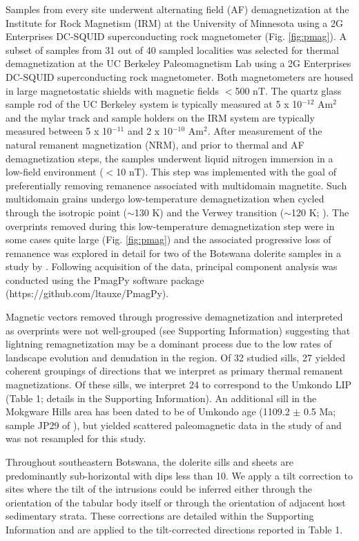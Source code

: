 \documentclass[11pt,letterpaper]{article}
\begin{document}
Samples from every site underwent alternating field (AF) demagnetization at the Institute for Rock Magnetism (IRM) at the University of Minnesota using a 2G Enterprises DC-SQUID superconducting rock magnetometer (Fig. \ref{fig:pmag}). A subset of samples from 31 out of 40 sampled localities was selected for thermal demagnetization at the UC Berkeley Paleomagnetism Lab using a 2G Enterprises DC-SQUID superconducting rock magnetometer. Both magnetometers are housed in large magnetostatic shields with magnetic fields $<$500 nT. The quartz glass sample rod of the UC Berkeley system is typically measured at 5 x 10$^{-12}$ Am$^2$ and the mylar track and sample holders on the IRM system are typically measured between 5 x 10$^{-11}$ and 2 x 10$^{-10}$ Am$^2$. After measurement of the natural remanent magnetization (NRM), and prior to thermal and AF demagnetization steps, the samples underwent liquid nitrogen immersion in a low-field environment ($<$10 nT). This step was implemented with the goal of preferentially removing remanence associated with multidomain magnetite. Such multidomain grains undergo low-temperature demagnetization when cycled through the isotropic point ($\sim$130 K) and the Verwey transition ($\sim$120 K; \cite{Verwey1939a, Feinberg2015a}). The overprints removed during this low-temperature demagnetization step were in some cases quite large (Fig. \ref{fig:pmag}) and the associated progressive loss of remanence was explored in detail for two of the Botswana dolerite samples in a study by \cite{Feinberg2015a}. Following acquisition of the data, principal component analysis \citep{Kirschvink1980a} was conducted using the PmagPy software package (https://github.com/ltauxe/PmagPy).

Magnetic vectors removed through progressive demagnetization and interpreted as overprints were not well-grouped (see Supporting Information) suggesting that lightning remagnetization may be a dominant process due to the low rates of landscape evolution and denudation in the region. Of 32 studied sills, 27 yielded coherent groupings of directions that we interpret as primary thermal remanent magnetizations. Of these sills, we interpret 24 to correspond to the Umkondo LIP (Table 1; details in the Supporting Information). An additional sill in the Mokgware Hills area has been dated to be of Umkondo age (1109.2 $\pm$ 0.5 Ma; sample JP29 of \cite{Hanson2004a}), but yielded scattered paleomagnetic data in the study of \cite{Pancake2001a} and was not resampled for this study.

Throughout southeastern Botswana, the dolerite sills and sheets are predominantly sub-horizontal with dips less than 10\textdegree. We apply a tilt correction to sites where the tilt of the intrusions could be inferred either through the orientation of the tabular body itself or through the orientation of adjacent host sedimentary strata. These corrections are detailed within the Supporting Information and are applied to the tilt-corrected directions reported in Table 1.
\end{document}
